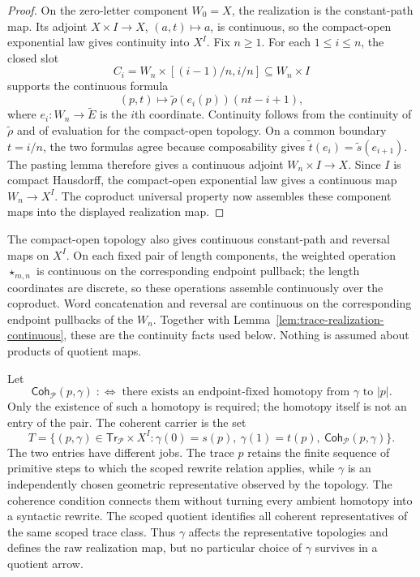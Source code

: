 \documentclass[10pt,reqno]{amsart}
\theoremstyle{definition}
\theoremstyle{plain}
\theoremstyle{remark}
\begin{document}
\begin{proof}
On the zero-letter component $W_0=X$, the realization is the constant-path
map.  Its adjoint $X\times I\to X$, $(a,t)\mapsto a$, is continuous, so the
compact-open exponential law gives continuity into $X^I$.  Fix $n\geq1$.
For each $1\leq i\leq n$, the closed slot
\[
  C_i=W_n\times[(i-1)/n,i/n]\subseteq W_n\times I
\]
supports the continuous formula
\[
  (p,t)\longmapsto
  \widetilde\rho(e_i(p))(nt-i+1),
\]
where $e_i:W_n\to\widetilde E$ is the $i$th coordinate.  Continuity follows
from the continuity of $\widetilde\rho$ and of evaluation for the compact-open
topology.  On a
common boundary $t=i/n$, the two formulas agree because composability gives
\(\widetilde t(e_i)=\widetilde s(e_{i+1})\).  The pasting lemma therefore gives a continuous adjoint
\(W_n\times I\to X\).  Since $I$ is compact Hausdorff, the compact-open
exponential law gives a continuous map $W_n\to X^I$.  The coproduct
universal property now assembles these component maps into the displayed
realization map.
\end{proof}

The compact-open topology also gives continuous constant-path and reversal
maps on $X^I$.  On each fixed pair of length components, the weighted
operation $\star_{m,n}$ is continuous on the corresponding endpoint
pullback; the length coordinates are discrete, so these operations assemble
continuously over the coproduct.  Word concatenation and reversal are
continuous on the corresponding endpoint pullbacks of the $W_n$.  Together
with Lemma~\ref{lem:trace-realization-continuous}, these are the continuity
facts used below.  Nothing is assumed about products of quotient maps.

Let
\[
  \mathsf{Coh}_{\mathcal P}(p,\gamma)\;:\Longleftrightarrow\;
  \text{there exists an endpoint-fixed homotopy from $\gamma$ to $|p|$}.
\]
Only the existence of such a homotopy is required; the homotopy itself is
not an entry of the pair.  The coherent carrier is the set
\[
  T=\{(p,\gamma)\in\mathsf{Tr}_{\mathcal P}\times X^I:
      \gamma(0)=s(p),\ \gamma(1)=t(p),\ \mathsf{Coh}_{\mathcal P}(p,\gamma)\}.
\]
The two entries have different jobs.  The trace $p$ retains the finite
sequence of primitive steps to which the scoped rewrite relation applies,
while $\gamma$ is an independently chosen geometric representative observed
by the topology.  The coherence condition connects them without turning every
ambient homotopy into a syntactic rewrite.  The scoped quotient identifies all
coherent representatives of the same scoped trace class.  Thus $\gamma$
affects the representative topologies and defines the raw realization map,
but no particular choice of $\gamma$ survives in a quotient arrow.
\end{document}

